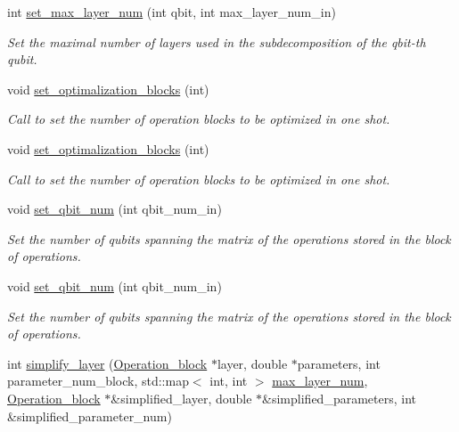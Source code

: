 \begin{DoxyCompactItemize}
int \hyperlink{class_decomposition___base_a6cbee8cd37f42b2fe6bdd6f5c0fd3fdb}{set\+\_\+max\+\_\+layer\+\_\+num} (int qbit, int max\+\_\+layer\+\_\+num\+\_\+in)
\begin{DoxyCompactList}\small\item\em Set the maximal number of layers used in the subdecomposition of the qbit-\/th qubit. \end{DoxyCompactList}\item 
void \hyperlink{class_decomposition___base_af3b3574285055f66f4769f6398a84745}{set\+\_\+optimalization\+\_\+blocks} (int)
\begin{DoxyCompactList}\small\item\em Call to set the number of operation blocks to be optimized in one shot. \end{DoxyCompactList}\item 
void \hyperlink{class_decomposition___base_af3b3574285055f66f4769f6398a84745}{set\+\_\+optimalization\+\_\+blocks} (int)
\begin{DoxyCompactList}\small\item\em Call to set the number of operation blocks to be optimized in one shot. \end{DoxyCompactList}\item 
void \hyperlink{class_operation__block_acc41ac933723558df3f4e65ae1158091}{set\+\_\+qbit\+\_\+num} (int qbit\+\_\+num\+\_\+in)
\begin{DoxyCompactList}\small\item\em Set the number of qubits spanning the matrix of the operations stored in the block of operations. \end{DoxyCompactList}\item 
void \hyperlink{class_operation__block_acc41ac933723558df3f4e65ae1158091}{set\+\_\+qbit\+\_\+num} (int qbit\+\_\+num\+\_\+in)
\begin{DoxyCompactList}\small\item\em Set the number of qubits spanning the matrix of the operations stored in the block of operations. \end{DoxyCompactList}\item 
int \hyperlink{class_n___qubit___decomposition_a13453d7704869cfc8536767c2db4518d}{simplify\+\_\+layer} (\hyperlink{class_operation__block}{Operation\+\_\+block} $\ast$layer, double $\ast$parameters, int parameter\+\_\+num\+\_\+block, std\+::map$<$ int, int $>$ \hyperlink{class_decomposition___base_a861d7b10226fc13f05c131e18c8be908}{max\+\_\+layer\+\_\+num}, \hyperlink{class_operation__block}{Operation\+\_\+block} $\ast$\&simplified\+\_\+layer, double $\ast$\&simplified\+\_\+parameters, int \&simplified\+\_\+parameter\+\_\+num)

\end{DoxyCompactItemize}

